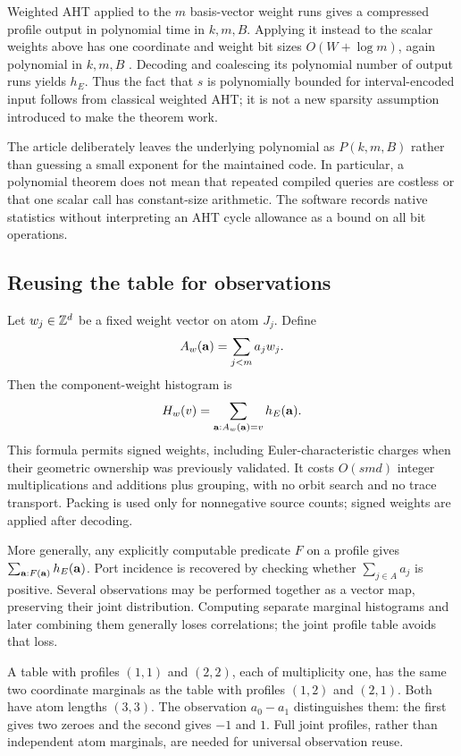 Weighted AHT applied to the $m$ basis-vector weight runs gives a compressed
profile output in polynomial time in $k,m,B$. Applying it instead to the
scalar weights above has one coordinate and weight bit sizes $O(W+\log m)$,
again polynomial in $k,m,B$ \cite{aht}. Decoding and coalescing its polynomial
number of output runs yields $h_E$. Thus the fact that $s$ is polynomially
bounded for interval-encoded input follows from classical weighted AHT; it
is not a new sparsity assumption introduced to make the theorem work.

The article deliberately leaves the underlying polynomial as
$P(k,m,B)$ rather than guessing a small exponent for the maintained code.
In particular, a polynomial theorem does not mean that repeated compiled
queries are costless or that one scalar call has constant-size arithmetic.
The software records native statistics without interpreting an AHT cycle
allowance as a bound on all bit operations.

\subsection{Reusing the table for observations}

Let $w_j\in\mathbb Z^d$ be a fixed weight vector on atom $J_j$. Define
\[
 A_w(\mathbf a)=\sum_{j<m}a_jw_j.
\]
Then the component-weight histogram is
\begin{equation}
 H_w(v)=\sum_{\mathbf a:A_w(\mathbf a)=v}h_E(\mathbf a).
 \label{eq:observe}
\end{equation}
This formula permits signed weights, including Euler-characteristic charges
when their geometric ownership was previously validated. It costs $O(smd)$
integer multiplications and additions plus grouping, with no orbit search
and no trace transport. Packing is used only for nonnegative source counts;
signed weights are applied after decoding.

More generally, any explicitly computable predicate $F$ on a profile gives
$\sum_{\mathbf a:F(\mathbf a)}h_E(\mathbf a)$. Port incidence is recovered by
checking whether $\sum_{j\in A}a_j$ is positive. Several observations may be
performed together as a vector map, preserving their joint distribution.
Computing separate marginal histograms and later combining them generally
loses correlations; the joint profile table avoids that loss.

\begin{example}
A table with profiles $(1,1)$ and $(2,2)$, each of multiplicity one, has the
same two coordinate marginals as the table with profiles $(1,2)$ and $(2,1)$.
Both have atom lengths $(3,3)$. The observation $a_0-a_1$ distinguishes them:
the first gives two zeroes and the second gives $-1$ and $1$. Full joint
profiles, rather than independent atom marginals, are needed for universal
observation reuse.
\end{example}

